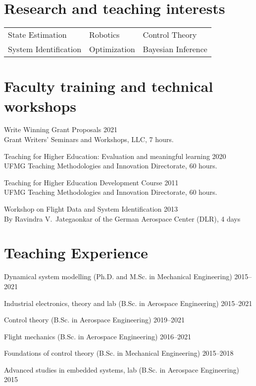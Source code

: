 \documentclass[letterpaper, 11pt, oneside]{memoir}
\begin{document}
\section{Research and teaching interests}
\begin{tabular}{lll}
  State Estimation & Robotics & Control Theory
  \\
  System Identification & Optimization & Bayesian Inference
\end{tabular}

\section{Faculty training and technical workshops}
\begin{description}
\item Write Winning Grant Proposals \hfill 2021
  \\
  Grant Writers' Seminars and Workshops, LLC, 7 hours.
\item Teaching for Higher Education: Evaluation and meaningful learning
  \hfill 2020
  \\
  UFMG Teaching Methodologies and Innovation Directorate, 60 hours.
\item Teaching for Higher Education Development Course \hfill 2011
  \\
  UFMG Teaching Methodologies and Innovation Directorate, 60 hours.
\item Workshop on Flight Data and System Identification \hfill 2013
  \\
  By Ravindra V.~Jategaonkar of the German Aerospace Center (DLR), 4 days
\end{description}

\clearpage

\section{Teaching Experience}
\begin{description}
\item 
{Dynamical system modelling (Ph.D. and M.Sc. in Mechanical Engineering)} \hfill {2015--2021}
\item 
{Industrial electronics, theory and lab (B.Sc. in Aerospace Engineering)} \hfill {2015--2021}
\item {Control theory (B.Sc. in Aerospace Engineering)} \hfill {2019--2021}
\item {Flight mechanics (B.Sc. in Aerospace Engineering)} \hfill {2016--2021}
\item {Foundations of control theory (B.Sc. in Mechanical Engineering)} \hfill {2015--2018}
\item 
{Advanced studies in embedded systems, lab (B.Sc. in Aerospace Engineering)} \hfill {2015}
\end{description}
\end{document}
